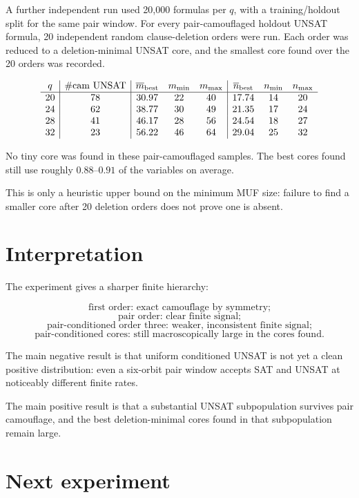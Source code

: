 \documentclass[11pt]{article}
\begin{document}
A further independent run used 20,000 formulas per $q$, with a training/holdout
split for the same pair window.  For every pair-camouflaged holdout UNSAT
formula, 20 independent random clause-deletion orders were run.  Each order
was reduced to a deletion-minimal UNSAT core, and the smallest core found over
the 20 orders was recorded.

\[
\begin{array}{c|c|ccc|ccc}
q&\#\mathrm{cam\ UNSAT}&
\overline m_{\rm best}&m_{\min}&m_{\max}&
\overline n_{\rm best}&n_{\min}&n_{\max}\\
\hline
20&78&30.97&22&40&17.74&14&20\\
24&62&38.77&30&49&21.35&17&24\\
28&41&46.17&28&56&24.54&18&27\\
32&23&56.22&46&64&29.04&25&32
\end{array}
\]

No tiny core was found in these pair-camouflaged samples.  The best cores
found still use roughly $0.88$--$0.91$ of the variables on average.

This is only a heuristic upper bound on the minimum MUF size: failure to find a
smaller core after 20 deletion orders does not prove one is absent.

\section{Interpretation}

The experiment gives a sharper finite hierarchy:

\[
\text{first order: exact camouflage by symmetry;}
\]
\[
\text{pair order: clear finite signal;}
\]
\[
\text{pair-conditioned order three: weaker, inconsistent finite signal;}
\]
\[
\text{pair-conditioned cores: still macroscopically large in the cores found.}
\]

The main negative result is that uniform conditioned UNSAT is not yet a clean
positive distribution: even a six-orbit pair window accepts SAT and UNSAT at
noticeably different finite rates.

The main positive result is that a substantial UNSAT subpopulation survives
pair camouflage, and the best deletion-minimal cores found in that
subpopulation remain large.

\section{Next experiment}
\end{document}
